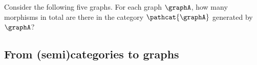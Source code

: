 
\vfill\pagebreak

\begin{widepar}
    \begin{gradedexercise}
        \label{ex:HowManyMorphisms}
        Consider the following five graphs.
        For each graph $\graphA$, how many morphisms in total are there in the category $\pathcat{\graphA}$ generated by $\graphA$?
    \end{gradedexercise}
\end{widepar}


\subsection[Categories from graphs]{From (semi)categories to graphs}
\label{sec:graphsfromcats}



